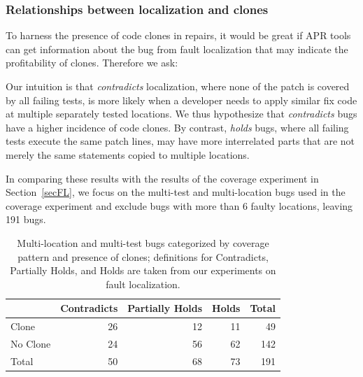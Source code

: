 \documentclass[10pt, conference]{IEEEtran}
\begin{document}
\subsubsection{Relationships between localization and clones}

To harness the presence of code clones in repairs, it would be great if 
APR tools can get information about the bug from fault localization that 
may indicate the profitability of clones. 
Therefore we ask: 


Our intuition is that \emph{contradicts} localization, where none of the patch is 
covered by all failing tests, is more likely when a
developer needs to apply similar fix code at multiple separately tested locations. 
We thus hypothesize that \emph{contradicts} bugs have a higher incidence of code
clones. By contrast, \emph{holds} bugs, where all failing tests execute 
the same patch lines, may have
more interrelated parts that are not merely the same statements copied to
multiple locations.

In comparing these results with the results of the coverage experiment in
Section~\ref{secFL}, we focus on the multi-test and multi-location bugs used in the coverage 
experiment and exclude bugs with more than 6 faulty locations, leaving 191 bugs.

\begin{table}
  {\begin{center}
      \begin{tabular} {lrrrr}
        \toprule
        & Contradicts & Partially Holds & Holds & Total \\
        \midrule
        Clone & 26 & 12 & 11 &  49 \\
        No Clone  & 24 & 56 & 62 & 142 \\
        \midrule
        Total     & 50 & 68 & 73 & 191 \\
        \bottomrule
      \end{tabular}
    \end{center}
  }
  \caption{Multi-location and multi-test bugs categorized by coverage pattern
    and presence of clones; definitions for Contradicts, Partially Holds, and
    Holds are taken from our experiments on fault localization.}
  \label{tab:cov_clones}
\end{table}
\end{document}
